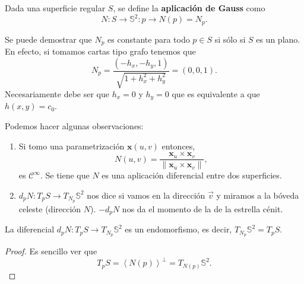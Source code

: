 \begin{definition}
Dada una superficie regular $\displaystyle S $, se define la \textbf{aplicación de Gauss} como
\[N : S \to \mathbb{S}^{2} : p \to N\left(p\right)=N_{p} .\]
\end{definition}
\begin{eg}[Plano]
Se puede demostrar que $\displaystyle N_{p} $ es constante para todo $\displaystyle p \in S $ si sólo si $\displaystyle S $ es un plano. En efecto, si tomamos cartas tipo grafo tenemos que 
\[N_{p}=\frac{\left(-h_{x}, -h_{y}, 1\right)}{\sqrt{1+h_{x}^{2}+h_{y}^{2}}}=\left(0,0,1\right) .\]
Necesariamente debe ser que $\displaystyle h_{x}=0 $ y $\displaystyle h_{y}=0 $ que es equivalente a que $\displaystyle h\left(x,y\right)=c_{0} $. 
\end{eg}
\begin{observation}
Podemos hacer algunas observaciones:
\begin{enumerate}
\item Si tomo una parametrización $\displaystyle \textbf{x} \left(u,v\right) $ entonces, 
	\[N\left(u,v\right)= \frac{ \textbf{x} _{u} \times \textbf{x} _{v}}{\| \textbf{x} _{u} \times \textbf{x} _{v}\|} ,\]
	es $\displaystyle \mathcal{C}^{\infty } $. Se tiene que $\displaystyle N $ es una aplicación diferencial entre dos superficies.
\item $\displaystyle d _{p}N : T_{p}S \to T_{N_{p}}\mathbb{S}^{2} $ nos dice si vamos en la dirección $\displaystyle \vec{v} $ y miramos a la bóveda celeste (dirección $\displaystyle N $). $\displaystyle - d _{p}N $ nos da el momento de la de la estrella cénit.
\end{enumerate}
\end{observation}
\begin{lema}
La diferencial $\displaystyle d _{p}N : T_{p}S \to T_{N_{p}}\mathbb{S}^{2} $ es un endomorfismo, es decir, $\displaystyle T_{N_{p}}\mathbb{S}^{2} = T_{p}S $.
\end{lema}
\begin{proof}
Es sencillo ver que 
\[T_{p}S = \left\langle N\left(p\right) \right\rangle ^{\perp }=T_{N\left(p\right)}\mathbb{S}^{2} .\]
\end{proof}

